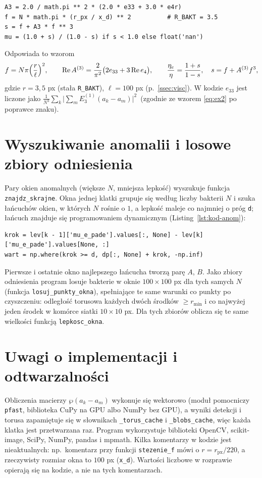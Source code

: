 \documentclass[12pt,a4paper,twoside,openright]{report}
\theoremstyle{definition}
\theoremstyle{remark}
\renewcommand{\Re}{\operatorname{Re}}
\begin{document}
{\begin{lstlisting}[style=pykod,caption={Obliczanie $\Re A^{(3)}$, stężenia $f$ i lepkości efektywnej (\texttt{lepkosc\_okna})},label={lst:kod-A3}]
A3 = 2.0 / math.pi ** 2 * (2.0 * e33 + 3.0 * e4r)
f = N * math.pi * (r_px / x_d) ** 2          # R_BAKT = 3.5
s = f + A3 * f ** 3
mu = (1.0 + s) / (1.0 - s) if s < 1.0 else float('nan')
\end{lstlisting}
Odpowiada to wzorom
\[
f=N\pi\Bigl(\frac{r}{\ell}\Bigr)^2,\qquad \Re A^{(3)}=\frac{2}{\pi^2}\bigl(2e_{33}+3\Re e_4\bigr),\qquad \frac{\eta_e}{\eta}=\frac{1+s}{1-s},\quad s=f+A^{(3)}f^3,
\]
gdzie $r=3{,}5$ px (stała \texttt{R\_BAKT}), $\ell=100$ px (p.~\ref{ssec:visc}). W kodzie $e_{33}$ jest liczone jako $\frac1{N^3}\sum_k\bigl|\sum_m E_3^{(1)}(a_k-a_m)\bigr|^2$\ (zgodnie ze wzorem \eqref{eq:ex2} po poprawce znaku).

\section{Wyszukiwanie anomalii i losowe zbiory odniesienia}
Pary okien anomalnych (większe $N$, mniejsza lepkość) wyszukuje funkcja \texttt{znajdz\_skrajne}. Okna jednej klatki grupuje się według liczby bakterii $N$ i szuka łańcuchów okien, w których $N$ rośnie o $1$, a lepkość maleje co najmniej o próg \texttt{d}; łańcuch znajduje się programowaniem dynamicznym (Listing~\ref{lst:kod-anom}):
\begin{lstlisting}[style=pykod,caption={Wyszukiwanie łańcuchów okien anomalnych (programowanie dynamiczne)},label={lst:kod-anom}]
krok = lev[k - 1]['mu_e_pade'].values[:, None] - lev[k]['mu_e_pade'].values[None, :]
wart = np.where(krok >= d, dp[:, None] + krok, -np.inf)
\end{lstlisting}
Pierwsze i ostatnie okno najlepszego łańcucha tworzą parę $A$, $B$. Jako zbiory odniesienia program losuje bakterie w oknie $100\times100$ px dla tych samych $N$ (funkcja \texttt{losuj\_punkty\_okna}), spełniające te same warunki co punkty po czyszczeniu: odległość torusowa każdych dwóch środków $\ge r_{\min}$ i co najwyżej jeden środek w komórce siatki $10\times10$ px. Dla tych zbiorów oblicza się te same wielkości funkcją \texttt{lepkosc\_okna}.

\section{Uwagi o implementacji i odtwarzalności}
Obliczenia macierzy $\wp(a_k-a_m)$ wykonuje się wektorowo (moduł pomocniczy \texttt{pfast}, biblioteka CuPy na GPU albo NumPy bez GPU), a wyniki detekcji i torusa zapamiętuje się w słownikach \texttt{\_torus\_cache} i \texttt{\_blobs\_cache}, więc każda klatka jest przetwarzana raz. Program wykorzystuje biblioteki OpenCV, scikit-image, SciPy, NumPy, pandas i mpmath. Kilka komentarzy w kodzie jest nieaktualnych: np.\ komentarz przy funkcji \texttt{stezenie\_f} mówi o $r=r_{\mathrm{px}}/220$, a rzeczywisty rozmiar okna to $100$ px (\texttt{x\_d}). Wartości liczbowe w rozprawie opierają się na kodzie, a nie na tych komentarzach.
}
\end{document}
